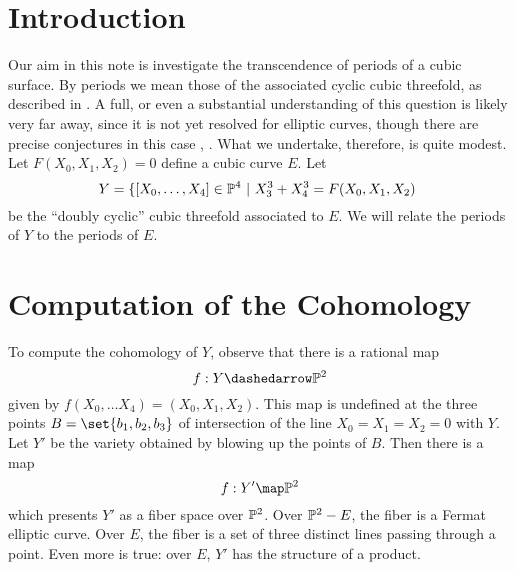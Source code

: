 \newcommand{  \fa  }{  {  \frak a  }  }
\newcommand{  \fb  }{  {  \frak b  }  }
\newcommand{  \fc  }{  {  \frak c  }  }
\newcommand{  \fd  }{  {  \frak d  }  }
\newcommand{  \fe  }{  {  \frak e  }  }
\newcommand{  \ff  }{  {  \frak f  }  }
\newcommand{  \fg  }{  {  \frak g  }  }
\newcommand{  \fh  }{  {  \frak h  }  }
\newcommand{  \fj  }{  {  \frak j  }  }
\newcommand{  \fk  }{  {  \frak k  }  }
\newcommand{  \fl  }{  {  \frak l  }  }
\newcommand{  \fm  }{  {  \frak m  }  }
\newcommand{  \fn  }{  {  \frak n  }  }
\newcommand{  \fo  }{  {  \frak o  }  }
\newcommand{  \fp  }{  {  \frak p  }  }
\newcommand{  \fq  }{  {  \frak q  }  }
\newcommand{  \fr  }{  {  \frak r  }  }
\newcommand{  \fs  }{  {  \frak s  }  }
\newcommand{  \ft  }{  {  \frak t  }  }
\newcommand{  \fu  }{  {  \frak u  }  }
\newcommand{  \fv  }{  {  \frak v  }  }
\newcommand{  \fw  }{  {  \frak w  }  }
\newcommand{  \fx  }{  {  \frak x  }  }
\newcommand{  \fy  }{  {  \frak y  }  }
\newcommand{  \fz  }{  {  \frak z  }  }









\section{Introduction}


Our aim in this note is investigate the transcendence of periods of a cubic surface. By
periods we mean those of the associated cyclic cubic threefold, as described in
\cite{ACT}. A full, or even a substantial understanding of this question is likely very
far away, since it is not yet resolved for elliptic curves, though there are precise
conjectures in this case \cite{Andre}, \cite{Waldschmitt}. What we undertake,
therefore, is quite modest. Let $F(X_0,X_1,X_2) = 0$ define a cubic curve $E$. Let
\[
   Y = \{ [X_0, \ldots, X_4] \in { \mathbb P }^4\ |\ X_3^3 + X_4^3 = F(X_0,X_1,X_2)\ 
\]
be the
``doubly cyclic'' cubic threefold associated to $E$. We will relate the periods of $Y$
to the periods of $E$.



\section{Computation of the Cohomology}

To compute the cohomology of $Y$, observe that there is a rational map \[ f: Y
\dashedarrow \PP^2 \] given by $f(X_0, \ldots X_4) = (X_0, X_1 , X_2)$. This map is
undefined at the three points $B = \set{b_1, b_2, b_3}$ of intersection of the line
$X_0 = X_1 = X_2 = 0$ with $Y$. Let $Y'$ be the variety obtained by blowing up the
points of $B$. Then there is a map \[ f: Y' \map \PP^2 \] which presents $Y'$ as a
fiber space over ${ \mathbb P }^2$. Over ${ \mathbb P }^2 - E$, the fiber is a Fermat elliptic curve. Over
$E$, the fiber is a set of three distinct lines passing through a point. Even more is
true: over $E$, $Y'$ has the structure of a product.

